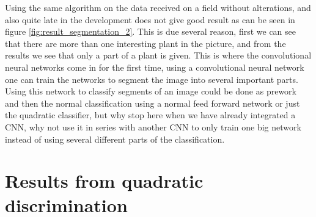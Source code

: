 Using the same algorithm on the data received on a field without alterations, and also quite late in the development does not give good result as can be seen in figure \ref{fig:result_segmentation_2}. This is due several reason, first we can see that there are more than one interesting plant in the picture, and from the results we see that only a part of a plant is given. This is where the convolutional neural networks come in for the first time, using a convolutional neural network one can train the networks to segment the image into several important parts. Using this network to classify segments of an image could be done as prework and then the normal classification using a normal feed forward network or just the quadratic classifier, but why stop here when we have already integrated a CNN, why not use it in series with another CNN to only train one big network instead of using several different parts of the classification. 



\section{Results from quadratic discrimination}

